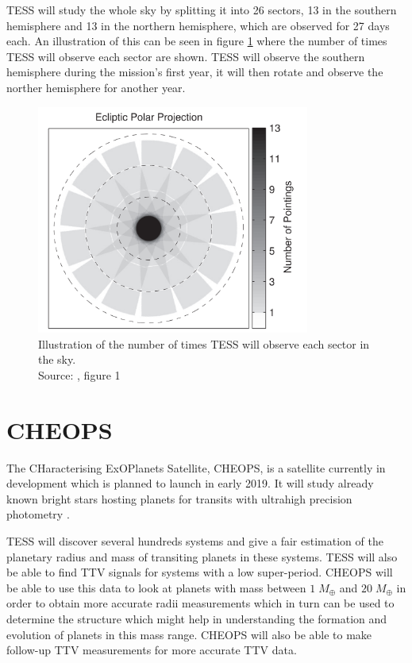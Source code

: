 \documentclass[12pt]{report}
\begin{document}
	TESS will study the whole sky by splitting it into 26 sectors, 13 in the southern hemisphere and 13 in the northern hemisphere, which are observed for 27 days each. An illustration of this can be seen in figure \ref{fig:tess_time} where the number of times TESS will observe each sector are shown. TESS will observe the southern hemisphere during the mission's first year, it will then rotate and observe the norther hemisphere for another year.
	\begin{figure}[h!]
	\centering
		\includegraphics[width=0.8\textwidth]{img/tess_observe_time.png}
		\caption{Illustration of the number of times TESS will observe each sector in the sky.\\ \small{Source: \cite{2015ApJ...809...77S}, figure 1}}
		\label{fig:tess_time}
	\end{figure}	
	
\section{CHEOPS}
	The CHaracterising ExOPlanets Satellite, CHEOPS, is a satellite currently in development which is planned to launch in early 2019. It will study already known bright stars hosting planets for transits with ultrahigh precision photometry \citep{2013EPJWC..4703005B}. 
	
	TESS will discover several hundreds systems and give a fair estimation of the planetary radius and mass of transiting planets in these systems. TESS will also be able to find TTV signals for systems with a low super-period. CHEOPS will be able to use this data to look at planets with mass between $1\; M_{\oplus}$ and $20\; M_{\oplus}$ in order to obtain more accurate radii measurements which in turn can be used to determine the structure which might help in understanding the formation and evolution of planets in this mass range. CHEOPS will also be able to make follow-up TTV measurements for more accurate TTV data.
	
\end{document}
